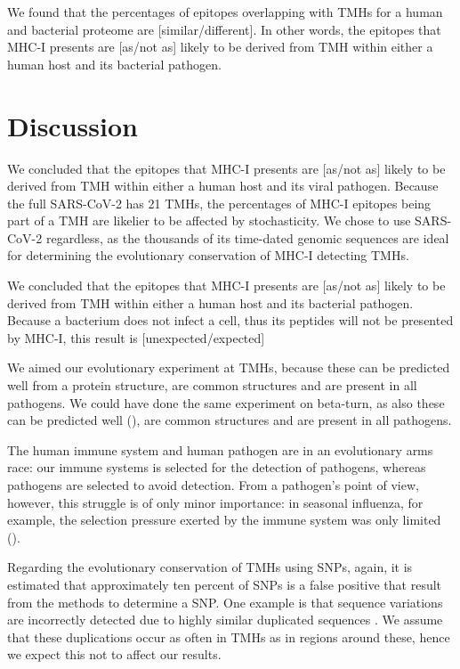 We found that the percentages of epitopes overlapping 
with TMHs for a human and bacterial proteome are 
[similar/different]. In other words, the
epitopes that MHC-I presents are [as/not as] likely 
to be derived from TMH within either a human host and its bacterial pathogen.

\section{Discussion}

We concluded that the
epitopes that MHC-I presents are [as/not as] likely 
to be derived from TMH within either a human host and its viral pathogen.
Because the full SARS-CoV-2 has 21 TMHs, the percentages
of MHC-I epitopes being part of a TMH are likelier to be affected by
stochasticity. We chose to use SARS-CoV-2 regardless, as the thousands
of its time-dated genomic sequences are ideal for determining the 
evolutionary conservation of MHC-I detecting TMHs. 

We concluded that the
epitopes that MHC-I presents are [as/not as] likely 
to be derived from TMH within either a human host and its bacterial pathogen.
Because a bacterium does not infect a cell, thus its peptides
will not be presented by MHC-I, this result is [unexpected/expected]

We aimed our evolutionary experiment at TMHs, because these can
be predicted well from a protein structure,
are common structures and are present in all pathogens. 
We could have done the same experiment on beta-turn,
as also these can be predicted well (\cite{petersen2010netturnp}),
are common structures and are present in all pathogens.

The human immune system and human pathogen are in an evolutionary
arms race: our immune systems is selected for the detection
of pathogens, whereas pathogens are selected to avoid detection.
From a pathogen's point of view, however, this struggle 
is of only minor importance:
in seasonal influenza, for example, the selection pressure
exerted by the immune system was only limited (\cite{han2019individual}).

Regarding the evolutionary conservation of TMHs using SNPs,
again, it is estimated that approximately ten percent
of SNPs is a false positive that result from the methods to determine
a SNP. One example is that sequence variations are incorrectly
detected due to highly similar duplicated sequences \cite{musumeci2010single}.
We assume that these duplications occur as often in TMHs as in
regions around these, hence we expect this not to affect our results.

